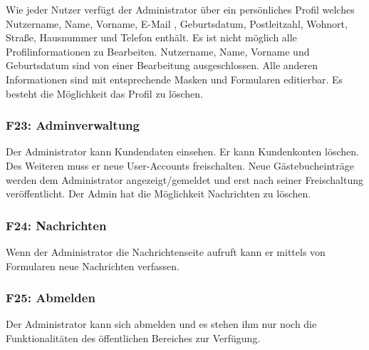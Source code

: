 \documentclass[10pt,a4paper]{scrartcl}
\begin{document}
Wie jeder Nutzer verfügt der Administrator über ein persönliches Profil welches Nutzername, Name, Vorname, E-Mail , Geburtsdatum, Postleitzahl, Wohnort, Straße, Hausnummer und Telefon enthält. Es ist nicht möglich alle Profilinformationen zu Bearbeiten. Nutzername, Name, Vorname und Geburtsdatum sind von einer Bearbeitung ausgeschlossen.
Alle anderen Informationen sind mit entsprechende Masken und Formularen editierbar. Es besteht die Möglichkeit das Profil zu löschen.

\subsubsection*{F23: Adminverwaltung}

Der Administrator kann Kundendaten einsehen. Er kann Kundenkonten löschen. Des Weiteren muss er neue User-Accounts freischalten.
Neue Gästebucheinträge werden dem Administrator angezeigt/gemeldet und erst nach seiner Freischaltung veröffentlicht.
Der Admin hat die Möglichkeit Nachrichten zu löschen.

\subsubsection*{F24: Nachrichten}
Wenn der Administrator die Nachrichtenseite aufruft kann er mittels von Formularen neue Nachrichten verfassen.

%



\subsubsection*{F25: Abmelden}

Der Administrator kann sich abmelden und es stehen ihm nur noch die Funktionalitäten des öffentlichen Bereiches zur Verfügung.
\end{document}
